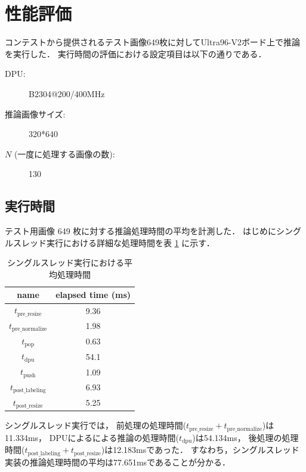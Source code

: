 \section{性能評価}
コンテストから提供されるテスト画像649枚に対してUltra96-V2ボード上で推論を実行した．
実行時間の評価における設定項目は以下の通りである．
\begin{description}
  \item[DPU:] B2304@200/400MHz
  \item[推論画像サイズ:] 320*640
  \item[$N$ (一度に処理する画像の数):] 130
\end{description}
\subsection{実行時間}
テスト用画像 649 枚に対する推論処理時間の平均を計測した．
はじめにシングルスレッド実行における詳細な処理時間を表 \ref{tbl:time-singlethread} に示す．

\begin{table}[h]
  \caption{シングルスレッド実行における平均処理時間} \vspace{1mm}
  \label{tbl:time-singlethread}
  \begin{center}
    \begin{tabular}{cc}
      name & elapsed time (ms) \\ \hline
      $t_{\mathrm{pre\_resize}}$    & 9.36 \\ \hline
      $t_{\mathrm{pre\_normalize}}$ & 1.98 \\ \hline
      $t_{\mathrm{pop}}$            & 0.63 \\ \hline
      $t_{\mathrm{dpu}}$            & 54.1 \\ \hline
      $t_{\mathrm{push}}$           & 1.09 \\ \hline
      $t_{\mathrm{post\_labeling}}$ & 6.93 \\ \hline
      $t_{\mathrm{post\_resize}}$   & 5.25 \\ \hline
    \end{tabular}
  \end{center}
\end{table}

シングルスレッド実行では，
前処理の処理時間($t_{\mathrm{pre\_resize}} + t_{\mathrm{pre\_normalize}}$)は11.334ms，
DPUによるによる推論の処理時間($t_{\mathrm{dpu}}$)は54.134ms，
後処理の処理時間($t_{\mathrm{post\_labeling}} + t_{\mathrm{post\_resize}}$)は12.183msであった．
すなわち，シングルスレッド実装の推論処理時間の平均は77.651msであることが分かる．

